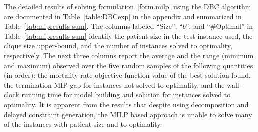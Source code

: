  The detailed results of solving formulation~\eqref{form.milp} using the DBC algorithm are documented in Table~\ref{table:DBCexp} in the appendix and summarized in Table~\ref{tab:mipresults-sum}. The columns labeled ``Size'',  ``$b$'', and ``\#Optimal'' in Table~\ref{tab:mipresults-sum} identify the patient size in the test instance used, the clique size upper-bound, and the number of instances solved to optimality, respectively. The next three columns report the average and the range (minimum and maximum) observed over the five random samples of the following quantities (in order): the mortality rate objective function value of the best solution found, the termination MIP gap for instances not solved to optimality, and the wall-clock running time for model building and solution for instances solved to optimality. It is apparent from the results that despite using decomposition  and delayed constraint generation, the MILP based approach is unable to solve many of the  instances with patient size  and  to optimality.
